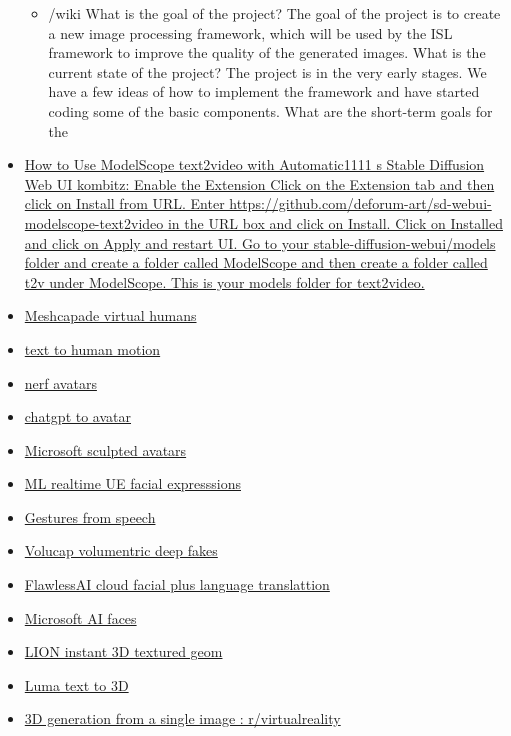 \begin{itemize}
  \begin{itemize}
  \tightlist
  \item
    /wiki What is the goal of the project? The goal of the project is to
    create a new image processing framework, which will be used by the
    ISL framework to improve the quality of the generated images. What
    is the current state of the project? The project is in the very
    early stages. We have a few ideas of how to implement the framework
    and have started coding some of the basic components. What are the
    short-term goals for the
  \end{itemize}
\item
  \href{https://www.kombitz.com/2023/03/28/how-to-use-modelscope-text2video-with-automatic1111s-stable-diffusion-web-ui/}{How
  to Use ModelScope text2video with Automatic1111 s Stable Diffusion Web
  UI \textbar{} kombitz: Enable the Extension Click on the Extension tab
  and then click on Install from URL. Enter
  https://github.com/deforum-art/sd-webui-modelscope-text2video in the
  URL box and click on Install. Click on Installed and click on Apply
  and restart UI. Go to your stable-diffusion-webui/models folder and
  create a folder called ModelScope and then create a folder called t2v
  under ModelScope. This is your models folder for text2video.}
\item
  \href{https://meshcapade.com/}{Meshcapade virtual humans}
\item
  \href{https://ofa-sys.github.io/MoFusion/}{text to human motion}
\item
  \href{https://www.linkedin.com/posts/reneschulte_nerf-deeplearning-metaverse-activity-7010898662465617921-56P_?utm_source=share\&utm_medium=member_desktop}{nerf
  avatars}
\item
  \href{https://twitter.com/IntuitMachine/status/1608690077139599360}{chatgpt
  to avatar}
\item
  \href{https://3d-avatar-diffusion.microsoft.com/?utm_campaign=AI\%20Art\%20Weekly\&utm_medium=email\&utm_source=Revue\%20newsletter\#/}{Microsoft
  sculpted avatars}
\item
  \href{https://80.lv/articles/ziva-dynamics-announces-a-new-ml-trained-facial-rigging-service/}{ML
  realtime UE facial expresssions}
\item
  \href{https://talkshow.is.tue.mpg.de/}{Gestures from speech}
\item
  \href{https://volucap.com/}{Volucap volumentric deep fakes}
\item
  \href{https://www.flawlessai.com/}{FlawlessAI cloud facial plus
  language translattion}
\item
  \href{https://www.youtube.com/watch?v=uboj01Gfy1A}{Microsoft AI faces}
\item
  \href{https://nv-tlabs.github.io/LION/}{LION instant 3D textured geom}
\item
  \href{https://captures.lumalabs.ai/imagine}{Luma text to 3D}
\item
  \href{https://www.reddit.com/r/virtualreality/comments/xvy5dc/3d_generation_from_a_single_image/}{3D
  generation from a single image : r/virtualreality}


\end{itemize}

